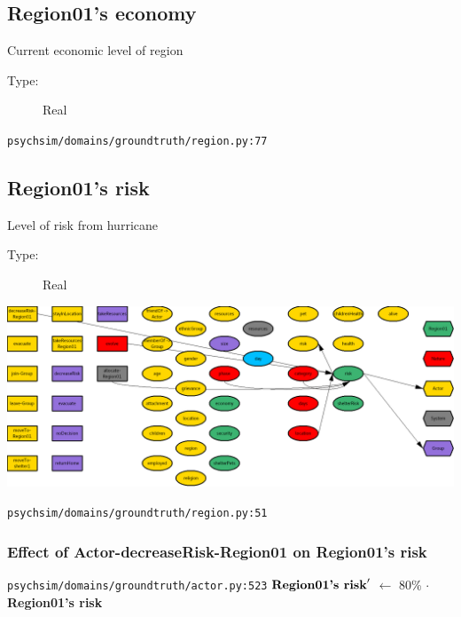 \documentclass{article}%
\begin{document}
%
\subsection{Region01's economy}%
\label{subsec:Region01's economy}%
Current economic level of region%
\begin{description}%
\item[Type:]%
Real%
\end{description}%
\begin{flushleft}%
\verb|psychsim/domains/groundtruth/region.py:77|%
\end{flushleft}

%
\subsection{Region01's risk}%
\label{subsec:Region01's risk}%
Level of risk from hurricane%
\begin{description}%
\item[Type:]%
Real%
\end{description}%
\includegraphics[width=\textwidth]{images/riskOfRegion01.png}%
\begin{flushleft}%
\verb|psychsim/domains/groundtruth/region.py:51|%
\end{flushleft}%
\subsubsection{Effect of Actor{-}decreaseRisk{-}Region01 on Region01's risk}%
\label{ssubsec:Effect of Actor{-}decreaseRisk{-}Region01 on Region01's risk}%
\begin{flushleft}%
\verb|psychsim/domains/groundtruth/actor.py:523|%
\linebreak%
$\mbox{\textbf{Region01's risk}} '$%
$\leftarrow$%
80\%%
$\cdot$%
\textbf{Region01's risk}%
\end{flushleft}

%
\end{document}
